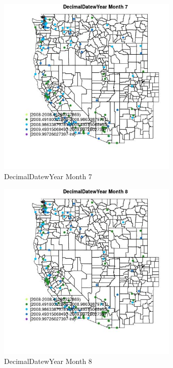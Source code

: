 \begin{figure} 
\centering  
\includegraphics[width=0.77\textwidth]{Code_Outputs/Report_ML_input_PM25_Step4_part_e_de_duplicated_aves_MapObsMo7DecimalDatewYear.jpg} 
\caption{\label{fig:Report_ML_input_PM25_Step4_part_e_de_duplicated_avesMapObsMo7DecimalDatewYear}DecimalDatewYear Month 7} 
\end{figure} 
 

\begin{figure} 
\centering  
\includegraphics[width=0.77\textwidth]{Code_Outputs/Report_ML_input_PM25_Step4_part_e_de_duplicated_aves_MapObsMo8DecimalDatewYear.jpg} 
\caption{\label{fig:Report_ML_input_PM25_Step4_part_e_de_duplicated_avesMapObsMo8DecimalDatewYear}DecimalDatewYear Month 8} 
\end{figure} 
 

